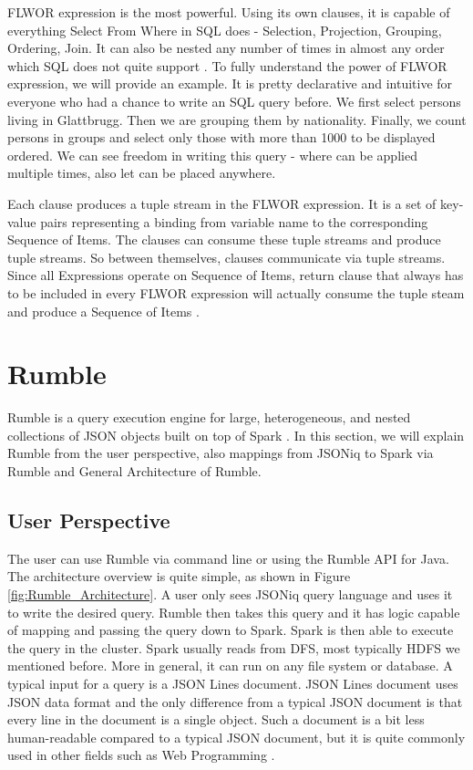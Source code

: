 FLWOR expression is the most powerful. Using its own clauses, it is capable of everything Select From Where in SQL does - Selection, Projection, Grouping, Ordering, Join. It can also be nested any number of times in almost any order which SQL does not quite support \cite{JSONiqBook}. To fully understand the power of FLWOR expression, we will provide an example. It is pretty declarative and intuitive for everyone who had a chance to write an SQL query before. We first select persons living in Glattbrugg. Then we are grouping them by nationality. Finally, we count persons in groups and select only those with more than 1000 to be displayed ordered. We can see freedom in writing this query - where can be applied multiple times, also let can be placed anywhere.



Each clause produces a tuple stream in the FLWOR expression. It is a set of key-value pairs representing a binding from variable name to the corresponding Sequence of Items. The clauses can consume these tuple streams and produce tuple streams. So between themselves, clauses communicate via tuple streams. Since all Expressions operate on Sequence of Items, return clause that always has to be included in every FLWOR expression will actually consume the tuple steam and produce a Sequence of Items \cite{JSONiqBook}.
   
\section{Rumble}
Rumble is a query execution engine for large, heterogeneous, and nested collections of JSON objects built on top of Spark \cite{RumblePaper}. In this section, we will explain Rumble from the user perspective, also mappings from JSONiq to Spark via Rumble and General Architecture of Rumble.
\subsection{User Perspective}
The user can use Rumble via command line or using the Rumble API for Java. The architecture overview is quite simple, as shown in Figure \ref{fig:Rumble_Architecture}. A user only sees JSONiq query language and uses it to write the desired query. Rumble then takes this query and it has logic capable of mapping and passing the query down to Spark. Spark is then able to execute the query in the cluster. Spark usually reads from DFS, most typically HDFS we mentioned before. More in general, it can run on any file system or database. A typical input for a query is a JSON Lines document. JSON Lines document uses JSON data format and the only difference from a typical JSON document is that every line in the document is a single object. Such a document is a bit less human-readable compared to a typical JSON document, but it is quite commonly used in other fields such as Web Programming \cite{RumbleYouTube}.

